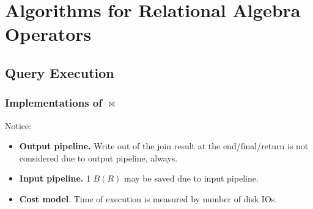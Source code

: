 \documentclass[a4paper]{report}
\begin{document}
\section{Algorithms for Relational Algebra Operators}
\subsection{Query Execution}\label{sec:queryExec}
\subsubsection{Implementations of $\bowtie$}

Notice:
\begin{itemize}
\item \textbf{Output pipeline.} Write out of the join result at the end/final/return is not considered due to output pipeline, always.
\item \textbf{Input pipeline.} 1 $B(R)$ may be saved due to input pipeline. 
\item \textbf{Cost model}. Time of execution is measured by number of disk IOs. 
\end{itemize}
\end{document}
